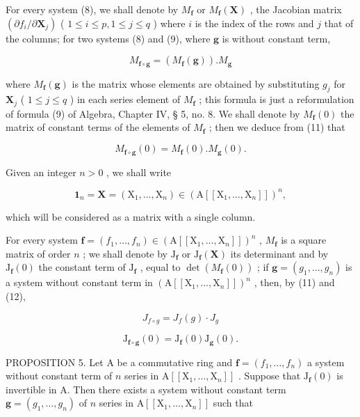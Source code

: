 For every system (8), we shall denote by \(M_{\mathbf{f}}\) or \(M_{\mathbf{f}}(\mathbf{X})\) , the Jacobian matrix \((\partial f_i / \partial \mathbf{X}_j)\) ( \(1 \leqslant i \leqslant p, 1 \leqslant j \leqslant q\) ) where \(i\) is the index of the rows and \(j\) that of the columns; for two systems (8) and (9), where \(\mathbf{g}\) is without constant term,

\[
M _ {\mathbf {f} \circ \mathbf {g}} = (M _ {\mathbf {f}} (\mathbf {g})). M _ {\mathbf {g}}\tag{11}
\]

where \(M_{\mathbf{f}}(\mathbf{g})\) is the matrix whose elements are obtained by substituting \(g_j\) for \(\mathbf{X}_j\) ( \(1 \leqslant j \leqslant q\) ) in each series element of \(M_{\mathbf{f}}\) ; this formula is just a reformulation of formula (9) of Algebra, Chapter IV, § 5, no. 8. We shall denote by \(M_{\mathbf{f}}(0)\) the matrix of constant terms of the elements of \(M_{\mathbf{f}}\) ; then we deduce from (11) that

\[
M _ {\mathbf {f} \circ \mathbf {g}} (0) = M _ {\mathbf {f}} (0). M _ {\mathbf {g}} (0).\tag{12}
\]

Given an integer \(n > 0\) , we shall write

\[
\mathbf {1} _ {n} = \mathbf {X} = (\mathrm{X} _ {1}, \dots , \mathrm{X} _ {n}) \in (\mathrm{A} [ [ \mathrm{X} _ {1}, \dots , \mathrm{X} _ {n} ] ]) ^ {n},\tag{13}
\]

which will be considered as a matrix with a single column.

For every system \(\mathbf{f} = (f_1, \ldots, f_n) \in (\mathrm{A}[[\mathrm{X}_1, \ldots, \mathrm{X}_n]])^n\) , \(M_{\mathbf{f}}\) is a square matrix of order \(n\) ; we shall denote by \(\mathrm{J}_{\mathbf{f}}\) or \(\mathrm{J}_{\mathbf{f}}(\mathbf{X})\) its determinant and by \(\mathrm{J}_{\mathbf{f}}(0)\) the constant term of \(\mathrm{J}_{\mathbf{f}}\) , equal to \(\det(M_{\mathbf{f}}(0))\) ; if \(\mathbf{g} = (g_1, \ldots, g_n)\) is a system without constant term in \((\mathrm{A}[[\mathrm{X}_1, \ldots, \mathrm{X}_n]])^n\) , then, by (11) and (12),

\[
J _ {f \circ g} = J _ {f} (g) \cdot J _ {g}\tag{14}
\]

\[
\mathrm{J} _ {\mathbf {f} \circ \mathbf {g}} (0) = \mathrm{J} _ {\mathbf {f}} (0) \mathrm{J} _ {\mathbf {g}} (0).\tag{15}
\]

PROPOSITION 5. Let A be a commutative ring and \(\mathbf{f} = (f_1, \ldots, f_n)\) a system without constant term of \(n\) series in \(\mathrm{A}[[\mathrm{X}_1, \ldots, \mathrm{X}_n]]\) . Suppose that \(\mathrm{J}_{\mathbf{f}}(0)\) is invertible in A. Then there exists a system without constant term \(\mathbf{g} = (g_1, \ldots, g_n)\) of \(n\) series in \(\mathrm{A}[[\mathrm{X}_1, \ldots, \mathrm{X}_n]]\) such that

